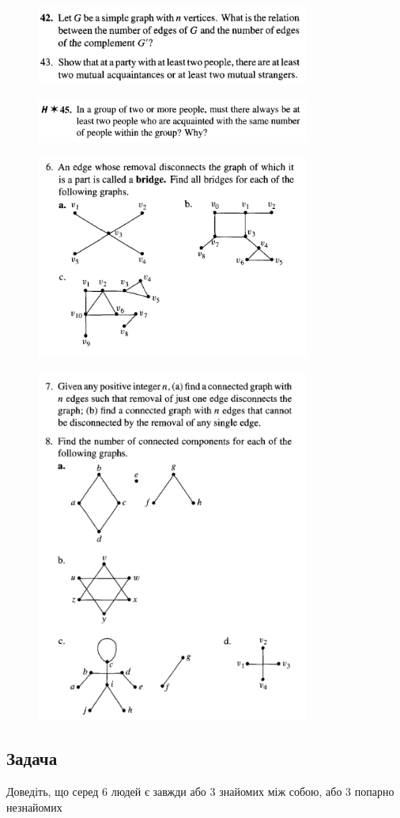 \documentclass{article}
\begin{document}
\begin{figure}
\centering
\includegraphics[width=90mm]{5}
\end{figure}

\begin{figure}
\centering
\includegraphics[width=90mm]{6}
\end{figure}

\begin{figure}
\centering
\includegraphics[width=90mm]{7}
\end{figure}

\begin{figure}
\centering
\includegraphics[width=90mm]{8}
\end{figure}

\pagebreak
\subsection*{Задача}
Доведіть, що серед 6 людей є завжди або 3 знайомих між собою, або 3 попарно незнайомих
\end{document}
